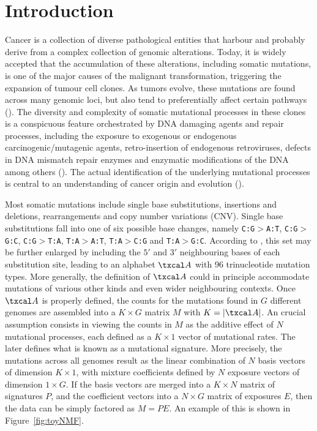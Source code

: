 \documentclass{bioinfo}
\begin{document}
\section{Introduction}
Cancer is a collection of diverse pathological entities that harbour
and probably derive from a complex collection of genomic
alterations. Today, it is widely accepted that the accumulation of
these alterations, including somatic mutations, is one of the major
causes of the malignant transformation, triggering the expansion of
tumour cell clones. As tumors evolve, these mutations are found across
many genomic loci, but also tend to preferentially affect certain
pathways (\citealp{CCSS}). The diversity and complexity of somatic
mutational processes in these clones is a conspicuous feature
orchestrated by DNA damaging agents and repair processes, including
the exposure to exogenous or endogenous carcinogenic/mutagenic agents,
retro-insertion of endogenous retroviruses, defects in DNA mismatch
repair enzymes and enzymatic modifications of the DNA among others
(\citealp{RG}). The actual identification of the underlying mutational
processes is central to an understanding of cancer origin and
evolution (\citealp{ANat, AS, HEN, RG}).


Most somatic mutations include single base substitutions,
insertions and deletions, rearrangements and copy number variations
(CNV). Single base substitutions fall into one of six possible base
changes, namely \texttt{C:G}$>$\texttt{A:T},
\texttt{C:G}$>$\texttt{G:C}, \texttt{C:G}$>$\texttt{T:A},
\texttt{T:A}$>$\texttt{A:T}, \texttt{T:A}$>$\texttt{C:G} and
\texttt{T:A}$>$\texttt{G:C}. According to \cite{A}, this set may be
further enlarged by including the $5'$ and $3'$ neighbouring bases of
each substitution site, leading to an alphabet $\txcal A$ with 96
trinucleotide mutation types. More generally, the definition of
$\txcal A$ could in principle accommodate mutations of various other
kinds
and even wider neighbouring contexts. Once $\txcal A$ is properly
defined, the counts for the mutations found in $G$ different genomes
are assembled into a $K\times G$ matrix $M$ with $K = |\txcal A|$. An
crucial assumption consists in viewing the counts in $M$ as the
additive effect of $N$ mutational processes, each defined as a
$K\times 1$ vector of mutational rates. The later defines what is
known as a mutational signature. More precisely, the mutations across
all genomes result as the linear combination of $N$ basis vectors of
dimension $K\times 1$, with mixture coefficients defined by $N$
exposure vectors of dimension $1 \times G$. If the basis vectors are
merged into a $K\times N$ matrix of signatures $P$, and the
coefficient vectors into a $N\times G$ matrix of exposures $E$, then
the data can be simply factored as $M=PE$. An example of this is shown
in Figure~\ref{fig:toyNMF}.
\end{document}
